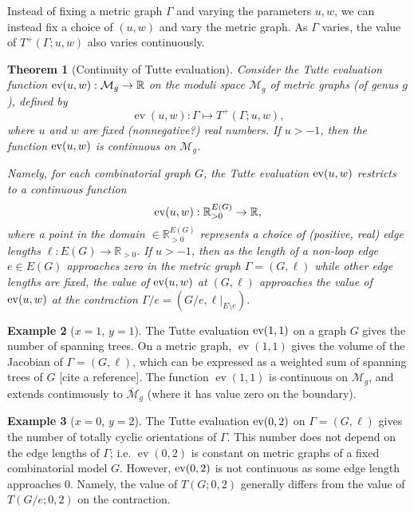 \documentclass{amsart}
\newtheorem{thm}{Theorem}
\theoremstyle{definition}
\newtheorem{eg}[thm]{Example}
\newcommand{\RR}{\mathbb{R}}
\DeclareMathOperator{\ev}{ev}
\begin{document}
Instead of fixing a metric graph $\Gamma$ and varying the parameters $u,w$,
we can instead fix a choice of $(u,w)$ and vary the metric graph.
As $\Gamma$ varies, the value of $T^+(\Gamma;u,w)$ also varies continuously.
\begin{thm}[Continuity of Tutte evaluation]
Consider the Tutte evaluation function %
${\rm ev}(u,w) : \mathcal M_g \to \RR$ 
on the moduli space 
$\mathcal M_g$ of metric graphs (of genus $g$),
defined by
$$ \ev(u,w) : \Gamma \mapsto T^+(\Gamma; u,w) ,$$
where  $u$ and $w$ are fixed (nonnegative?) real numbers.
If $u > -1$, 
then the function ${\rm ev}(u,w)$ is continuous on $\mathcal M_g$.

Namely, for each combinatorial graph $G$,
the Tutte evaluation 
${\rm ev}(u,w) $ 
restricts to a continuous function
$$ {\rm ev}(u,w) : \RR_{>0}^{E(G)} \to \RR,$$ 
where a point in the domain $ \in \RR_{>0}^{E(G)}$
represents a choice of (positive, real) edge lengths  $\ell : E(G) \to \RR_{>0}$.
If $u > -1$, then as the length of a  non-loop edge $e \in E(G)$ approaches zero
in the metric graph $\Gamma = (G,\ell)$
while other edge lengths are fixed,
the value of 
${\rm ev}(u,w)$
at $(G,\ell)$ %
approaches the value of ${\rm ev}(u,w)$ at the contraction 
$\Gamma / e = (G / e, \ell \big|_{E\setminus e})$.
\end{thm}

\begin{eg}
[$x = 1$, $y=1$]
The Tutte evaluation ${\rm ev}(1,1)$ 
on a graph $G$ gives the number of spanning trees.
On a metric graph, $\ev(1,1)$ gives the volume of the Jacobian of
$\Gamma = (G,\ell)$,
which can be expressed as a weighted sum of spanning trees of $G$ [cite a reference].
The function $\ev(1,1)$ is continuous on $\mathcal M_g$, 
and extends continuously to $\overline{\mathcal M}_g$ 
(where it has value zero on the boundary).
\end{eg}
\begin{eg}
[$x = 0$, $y=2$]
The Tutte evaluation ${\rm ev}(0,2)$ 
on $\Gamma = (G,\ell)$ gives the number of totally cyclic orientations of $\Gamma$.
This number does not depend on the edge lengths of $\Gamma$;
i.e. $\ev(0,2)$
 is constant on metric graphs %
of a fixed combinatorial model $G$.
However, ${\rm ev}(0,2)$ is not continuous as some edge length approaches $0$.
Namely, the value of $T(G; 0, 2)$ generally differs from the value of $T(G/e; 0,2)$
on the contraction.
\end{eg}
\end{document}
